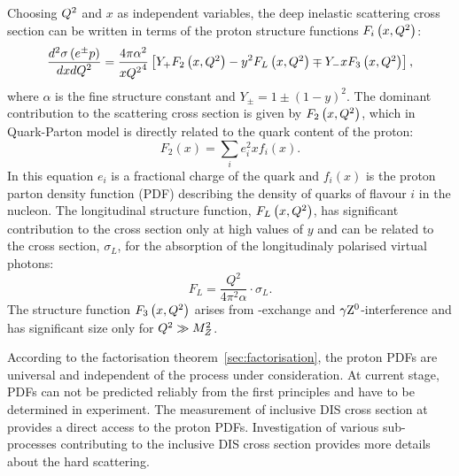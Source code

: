Choosing $\mbox{${Q^2}$}$ and $x$ as independent variables, the deep inelastic scattering cross section can be written in terms of the proton structure functions $F_i\left(x,\mbox{${Q^2}$}\right)$:
\begin{equation}
\frac{d^2\sigma\left( e^\pm p \right) }{dxd\mbox{${Q^2}$}} = \frac{4\pi\alpha^2}{x\mbox{${Q^2}$}^4}\left[ Y_+F_2\left(x,\mbox{${Q^2}$}\right) - y^2F_L\left(x,\mbox{${Q^2}$}\right) \mp Y_-xF_3\left(x,\mbox{${Q^2}$}\right) \right],
\label{eq:ddifDIS}
\end{equation}
where $\alpha$ is the fine structure constant and $Y_\pm = 1 \pm \left( 1 - y \right)^2$. The dominant contribution to the scattering cross section is given by $F_2\left(x,\mbox{${Q^2}$}\right)$, which in Quark-Parton model is directly related to the quark content of the proton:
\begin{equation}
F_2\left(x\right) = \sum_i{e_i^2xf_i\left(x\right)}.
\label{eq:f2pdf}
\end{equation}
In this equation $e_i$ is a fractional charge of the quark and $f_i\left(x\right)$ is the proton parton density function (PDF) describing the density of quarks of flavour $i$ in the nucleon. The longitudinal structure function, $F_L\left(x,\mbox{${Q^2}$}\right)$, has significant contribution to the cross section only at high values of $y$ and can be related to the cross section, $\sigma_L$, for the absorption of the longitudinaly polarised virtual photons:
\begin{equation}
F_L = \frac{Q^2}{4\pi^2\alpha}\cdot \sigma_L.
\label{eq:sigmal}
\end{equation}
The structure function $F_3\left(x,\mbox{${Q^2}$}\right)$ arises from \zn-exchange and $\gamma\mbox{$\rm{Z}^0$}$-interference and has significant size only for $\mbox{${Q^2}$} \gg M^2_Z$.

According to the factorisation theorem~\ref{sec:factorisation}, the proton PDFs are universal and independent of the process under consideration. At current stage, PDFs can not be predicted reliably from the first principles and have to be determined in experiment. The measurement of inclusive DIS cross section at \hera provides a direct access to the proton PDFs. Investigation of various sub-processes contributing to the inclusive DIS cross section provides more details about the hard scattering.
